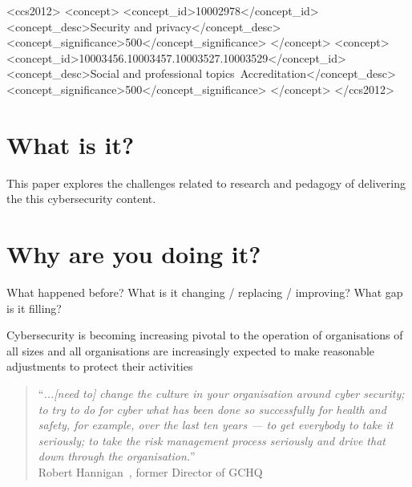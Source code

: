\documentclass[sigconf]{acmart}
\begin{document}
\begin{CCSXML}
<ccs2012>
<concept>
<concept_id>10002978</concept_id>
<concept_desc>Security and privacy</concept_desc>
<concept_significance>500</concept_significance>
</concept>
<concept>
<concept_id>10003456.10003457.10003527.10003529</concept_id>
<concept_desc>Social and professional topics~Accreditation</concept_desc>
<concept_significance>500</concept_significance>
</concept>
</ccs2012>
\end{CCSXML}





\maketitle


\section {What is it?}

This paper explores the challenges related to research and pedagogy of delivering the this cybersecurity content.

\section {Why are you doing it?}	What happened before? What is it changing / replacing / improving? What gap is it filling?

Cybersecurity is becoming increasing pivotal to the operation of organisations of all sizes and all organisations are increasingly expected to make reasonable adjustments to protect their activities 

\begin{quote}
	``{\emph{...[need to] change the culture in your organisation around cyber security; to try to do for cyber what has been done so successfully for health and safety, for example, over the last ten years --- to get everybody to take it seriously; to take the risk management process seriously and drive that down through the organisation.}}''\\
	\hfill Robert Hannigan~\cite{Hannigan2019a}, former Director of GCHQ
\end{quote}
\end{document}
